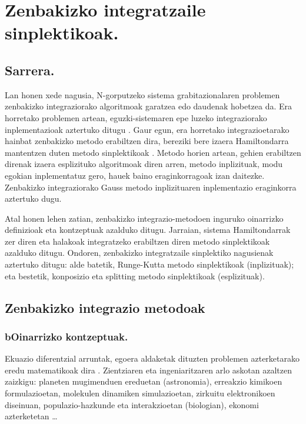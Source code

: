 \chapter{Zenbakizko integratzaile sinplektikoak.}

\section{Sarrera.}

Lan honen xede nagusia, N-gorputzeko sistema grabitazionalaren problemen zenbakizko integraziorako algoritmoak garatzea edo daudenak hobetzea da. Era horretako problemen artean, eguzki-sistemaren epe luzeko integraziorako inplementazioak aztertuko ditugu \cite{Kholshevnikov2007,Brumberg2013} . Gaur egun, era horretako integrazioetarako hainbat zenbakizko metodo erabiltzen dira, bereziki bere izaera Hamiltondarra mantentzen duten metodo sinplektikoak \cite{Eggl2010,Saha1992,Farres2013}. Metodo horien artean, gehien erabiltzen direnak izaera esplizituko algoritmoak diren arren, metodo inplizituak, modu egokian inplementatuz gero, hauek baino eraginkorragoak izan daitezke. Zenbakizko integraziorako Gauss metodo inplizituaren inplementazio eraginkorra aztertuko dugu.   

Atal honen lehen zatian, zenbakizko integrazio-metodoen inguruko oinarrizko definizioak eta kontzeptuak azalduko ditugu. 
Jarraian, sistema Hamiltondarrak zer diren eta halakoak integratzeko erabiltzen diren metodo sinplektikoak azalduko ditugu. Ondoren, zenbakizko integratzaile sinplektiko nagusienak aztertuko ditugu: alde batetik, Runge-Kutta metodo sinplektikoak (inplizituak); eta bestetik, konposizio eta splitting metodo sinplektikoak (esplizituak).

\section{Zenbakizko integrazio metodoak}

\subsection{bOinarrizko kontzeptuak.}

Ekuazio diferentzial arruntak, egoera aldaketak dituzten problemen azterketarako eredu matematikoak dira \cite{Hairer2015}. Zientziaren eta ingeniaritzaren arlo askotan azaltzen zaizkigu: planeten mugimenduen ereduetan (astronomia), erreakzio kimikoen formulazioetan, molekulen dinamiken simulazioetan, zirkuitu elektronikoen diseinuan, populazio-hazkunde eta interakzioetan (biologian), ekonomi azterketetan \ldots  

